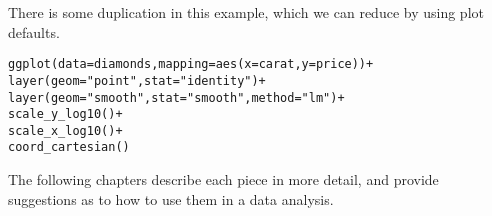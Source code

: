 There is some duplication in this example, which we can reduce by using plot defaults.

\begin{alltt}
ggplot(data = diamonds, mapping = aes(x = carat, y = price)) + 
layer(geom = "point", stat = "identity") + 
layer(geom = "smooth", stat = "smooth", method = "lm") + 
scale_y_log10() + 
scale_x_log10() + 
coord_cartesian()
\end{alltt}

The following chapters describe each piece in more detail, and provide suggestions as to how to use them in a data analysis.




